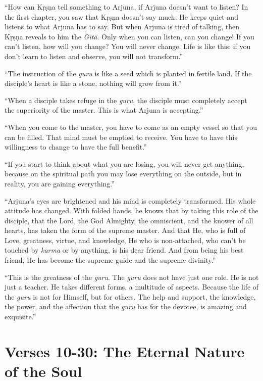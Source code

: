 \enquote{How can Kṛṣṇa tell something to Arjuna, if Arjuna doesn’t want to listen? In the first chapter, you saw that Kṛṣṇa doesn’t say much: He keeps quiet and listens to what Arjuna has to say. But when Arjuna is tired of talking, then Kṛṣṇa reveals to him the \textit{Gītā}. Only when you can listen, can you change! If you can’t listen, how will you change? You will never change. Life is like this: if you don’t learn to listen and observe, you will not transform.}

\enquote{The instruction of the \textit{guru} is like a seed which is planted in fertile land. If the disciple’s heart is like a stone, nothing will grow from it.}

\enquote{When a disciple takes refuge in the \textit{guru}, the disciple must completely accept the superiority of the master. This is what Arjuna is accepting.}

\enquote{When you come to the master, you have to come as an empty vessel so that you can be filled. That mind must be emptied to receive. You have to have this willingness to change to have the full benefit.}

\enquote{If you start to think about what you are losing, you will never get anything, because on the spiritual path you may lose everything on the outside, but in reality, you are gaining everything.}

\enquote{Arjuna’s eyes are brightened and his mind is completely transformed. His whole attitude has changed. With folded hands, he knows that by taking this role of the disciple, that the Lord, the God Almighty, the omniscient, and the knower of all hearts, has taken the form of the supreme master. And that He, who is full of Love, greatness, virtue, and knowledge, He who is non-attached, who can’t be touched by \textit{karma} or by anything, is his dear friend. And from being his best friend, He has become the supreme guide and the supreme divinity.}

\enquote{This is the greatness of the \textit{guru}. The \textit{guru} does not have just one role. He is not just a teacher. He takes different forms, a multitude of aspects. Because the life of the \textit{guru} is not for Himself, but for others. The help and support, the knowledge, the power, and the affection that the \textit{guru} has for the devotee, is amazing and exquisite.}

\newpage
\section{Verses 10-30: The Eternal Nature of the Soul}\label{sec-verses-10-30-the-eternal-nature-of-the-soul}


